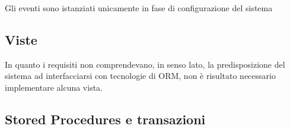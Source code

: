 Gli eventi sono istanziati unicamente in fase di configurazione del sistema

\pagebreak
{}

\subsection*{Viste}
%
%

In quanto i requisiti non comprendevano, in senso lato, la predisposizione
del sistema ad interfacciarsi con tecnologie di ORM, non è risultato necessario
implementare alcuna vista.

\pagebreak

\subsection*{Stored Procedures e transazioni}
%
%

